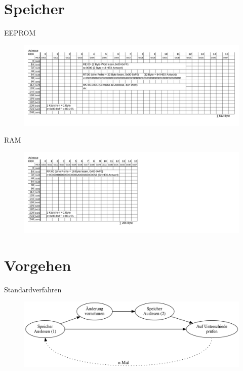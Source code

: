 \documentclass[
  de, %
  inputenc=utf8,
]{tuhhslides}
\begin{document}
\section{Speicher}
\begin{frame}{EEPROM}
  \begin{figure}
    \begin{center}
      \hspace*{-1cm}
      \includegraphics[scale=0.46]{Material/Speicher-Schema-Jura-EEPROM}
    \end{center}
  \end{figure}
\end{frame}

\begin{frame}{RAM}
  \begin{figure}
    \begin{center}
      \hspace*{-1cm}
      \includegraphics[scale=0.46]{Material/Speicher-Schema-Jura-Ram}
    \end{center}
  \end{figure}
\end{frame}



\section{Vorgehen}
\begin{frame}{Standardverfahren}
  \begin{figure}
    \begin{center}
      \hspace*{-1cm}
      \includegraphics[scale=0.54]{Material/workflow}
    \end{center}
  \end{figure}
\end{frame}
\end{document}

